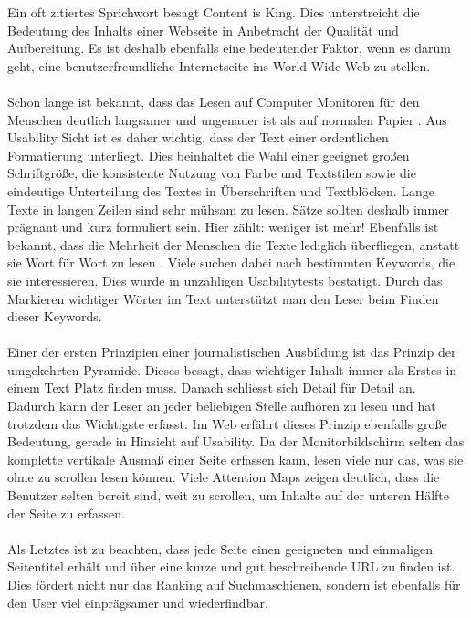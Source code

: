 Ein oft zitiertes Sprichwort besagt \glqq Content is King\grqq{}. Dies unterstreicht die Bedeutung des Inhalts einer Webseite in Anbetracht der Qualität und Aufbereitung. Es ist deshalb ebenfalls eine bedeutender Faktor, wenn es darum geht, eine benutzerfreundliche Internetseite ins World Wide Web zu stellen.\\
\\
Schon lange ist bekannt, dass das Lesen auf Computer Monitoren für den Menschen deutlich langsamer und ungenauer ist als auf normalen Papier \cite{screenvspaper}. Aus Usability Sicht ist es daher wichtig, dass der Text einer ordentlichen Formatierung unterliegt. Dies beinhaltet die Wahl einer geeignet großen Schriftgröße, die konsistente Nutzung von Farbe und Textstilen sowie die eindeutige Unterteilung des Textes in Überschriften und Textblöcken. Lange Texte in langen Zeilen sind sehr mühsam zu lesen. Sätze sollten deshalb immer prägnant und kurz formuliert sein. Hier zählt: weniger ist mehr! Ebenfalls ist bekannt, dass die Mehrheit der Menschen die Texte lediglich überfliegen, anstatt sie Wort für Wort zu lesen \cite{howtoreadinweb}. Viele suchen dabei nach bestimmten Keywords, die sie interessieren. Dies wurde in unzähligen Usabilitytests bestätigt. Durch das Markieren wichtiger Wörter im Text unterstützt man den Leser beim Finden dieser Keywords.\\
\\
Einer der ersten Prinzipien einer journalistischen Ausbildung ist das Prinzip der \glqq umgekehrten Pyramide\grqq{}. Dieses besagt, dass wichtiger Inhalt immer als Erstes in einem Text Platz finden muss. Danach schliesst sich Detail für Detail an. Dadurch kann der Leser an jeder beliebigen Stelle aufhören zu lesen und hat trotzdem das Wichtigste erfasst. Im Web erfährt dieses Prinzip ebenfalls große Bedeutung, gerade in Hinsicht auf Usability. Da der Monitorbildschirm selten das komplette vertikale Ausmaß einer Seite erfassen kann, lesen viele nur das, was sie ohne zu scrollen lesen können. Viele Attention Maps zeigen deutlich, dass die Benutzer selten bereit sind, weit zu scrollen, um Inhalte auf der unteren Hälfte der Seite zu erfassen.\\
\\
Als Letztes ist zu beachten, dass jede Seite einen geeigneten und einmaligen Seitentitel erhält und über eine kurze und gut beschreibende URL zu finden ist. Dies fördert nicht nur das Ranking auf Suchmaschienen, sondern ist ebenfalls für den User viel einprägsamer und wiederfindbar.
